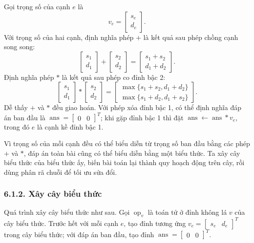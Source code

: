 \documentclass[11pt]{article}
\begin{document}
Gọi trọng số của cạnh \(e\) là
\[
  v_e=\begin{bmatrix}s_e\\d_e\end{bmatrix}.
\]
Với trọng số của hai cạnh, định nghĩa phép \(+\) là kết quả sau phép chồng
cạnh song song:
\[
  \begin{bmatrix}s_1\\d_1\end{bmatrix}
  +
  \begin{bmatrix}s_2\\d_2\end{bmatrix}
  =
  \begin{bmatrix}s_1+s_2\\d_1+d_2\end{bmatrix}.
\]
Định nghĩa phép \(\ast\) là kết quả sau phép co đỉnh bậc 2:
\[
  \begin{bmatrix}s_1\\d_1\end{bmatrix}
  \ast
  \begin{bmatrix}s_2\\d_2\end{bmatrix}
  =
  \begin{bmatrix}
  \max\{s_1+s_2,d_1+d_2\}\\
  \max\{s_1+d_2,d_1+s_2\}
  \end{bmatrix}.
\]
Dễ thấy \(+\) và \(\ast\) đều giao hoán. Với phép xóa đỉnh bậc 1, có thể định
nghĩa đáp án ban đầu là \(\operatorname{ans}=\begin{bmatrix}0&0\end{bmatrix}^T\);
khi gặp đỉnh bậc 1 thì đặt \(\operatorname{ans}\leftarrow\operatorname{ans}
\ast v_e\), trong đó \(e\) là cạnh kề đỉnh bậc 1.

Vì trọng số của mỗi cạnh đều có thể biểu diễn từ trọng số ban đầu bằng các
phép \(+\) và \(\ast\), đáp án toàn bài cũng có thể biểu diễn bằng một biểu
thức. Ta xây cây biểu thức của biểu thức ấy, biến bài toán lại thành quy
hoạch động trên cây, rồi dùng phân rã chuỗi để tối ưu sửa đổi.

\subsubsection*{6.1.2. Xây cây biểu thức}

Quá trình xây cây biểu thức như sau. Gọi \(\operatorname{op}_v\) là toán tử ở
đỉnh không lá \(v\) của cây biểu thức. Trước hết với mỗi cạnh \(e\), tạo đỉnh
tương ứng \(v_e=\begin{bmatrix}s_e&d_e\end{bmatrix}^T\) trong cây biểu thức;
với đáp án ban đầu, tạo đỉnh
\(\operatorname{ans}=\begin{bmatrix}0&0\end{bmatrix}^T\).
\end{document}
